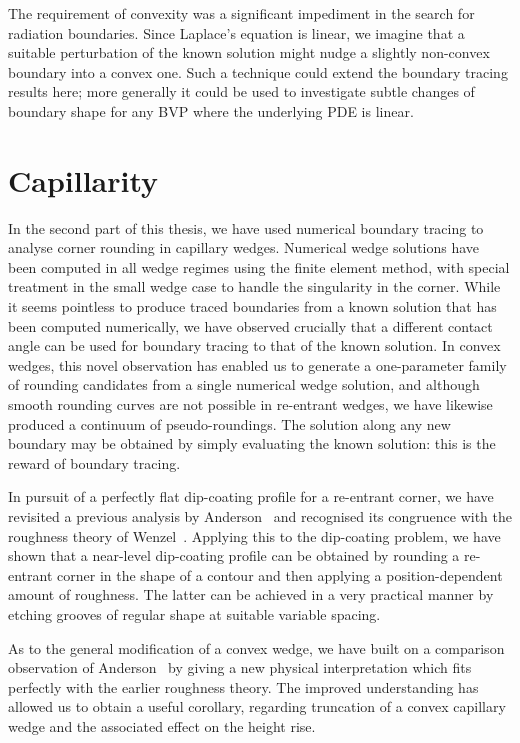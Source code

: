The requirement of convexity was a significant impediment
in the search for radiation boundaries.
Since Laplace's equation is linear,
we imagine that a suitable perturbation of the known solution
might nudge a slightly non-convex boundary
into a convex one.
Such a technique could extend the boundary tracing results here;
more generally it could be used to investigate
subtle changes of boundary shape
for any BVP where the underlying PDE is linear.

\section{Capillarity}
\label{sec:concluding.capillarity}

In the second part of this thesis,
we have used numerical boundary tracing
to analyse corner rounding in capillary wedges.
Numerical wedge solutions have been computed in all wedge regimes
using the finite element method,
with special treatment in the small wedge case
to handle the singularity in the corner.
While it seems pointless to produce traced boundaries
from a known solution that has been computed numerically,
we have observed crucially that
a different contact angle can be used for boundary tracing
to that of the known solution.
In convex wedges,
this novel observation has enabled us to generate
a one-parameter family of rounding candidates
from a single numerical wedge solution,
and although smooth rounding curves
are not possible in re-entrant wedges,
we have likewise produced a continuum of pseudo-roundings.
The solution along any new boundary
may be obtained by simply evaluating the known solution:
this is the reward of boundary tracing.

In pursuit of a perfectly flat dip-coating profile
for a re-entrant corner,
we have revisited a previous analysis
by Anderson~\cite{anderson-2002-thesis-boundary-tracing-pdes}
and recognised its congruence with the roughness theory
of Wenzel~\cite{wenzel-1936-resistance-solid-surfaces-wetting}.
Applying this to the dip-coating problem,
we have shown that
a near-level dip-coating profile can be obtained
by rounding a re-entrant corner in the shape of a contour
and then applying a position-dependent amount of roughness.
The latter can be achieved in a very practical manner
by etching grooves of regular shape at suitable variable spacing.

As to the general modification of a convex wedge,
we have built on a comparison observation
of Anderson~\cite{anderson-2002-thesis-boundary-tracing-pdes}
by giving a new physical interpretation
which fits perfectly with the earlier roughness theory.
The improved understanding has allowed us to obtain a useful corollary,
regarding truncation of a convex capillary wedge
and the associated effect on the height rise.

